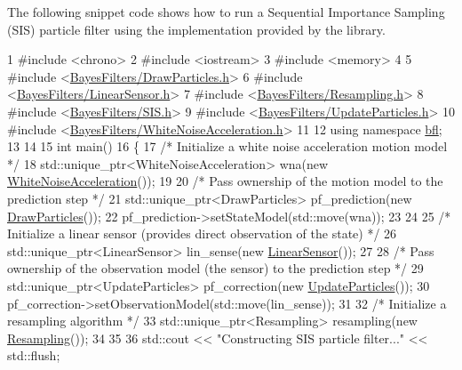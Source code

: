 The following snippet code shows how to run a Sequential Importance Sampling (S\+IS) particle filter using the implementation provided by the library.~\newline



\begin{DoxyCodeInclude}
1 \textcolor{preprocessor}{#include <chrono>}
2 \textcolor{preprocessor}{#include <iostream>}
3 \textcolor{preprocessor}{#include <memory>}
4 
5 \textcolor{preprocessor}{#include <\mbox{\hyperlink{DrawParticles_8h}{BayesFilters/DrawParticles.h}}>}
6 \textcolor{preprocessor}{#include <\mbox{\hyperlink{LinearSensor_8h}{BayesFilters/LinearSensor.h}}>}
7 \textcolor{preprocessor}{#include <\mbox{\hyperlink{Resampling_8h}{BayesFilters/Resampling.h}}>}
8 \textcolor{preprocessor}{#include <\mbox{\hyperlink{SIS_8h}{BayesFilters/SIS.h}}>}
9 \textcolor{preprocessor}{#include <\mbox{\hyperlink{UpdateParticles_8h}{BayesFilters/UpdateParticles.h}}>}
10 \textcolor{preprocessor}{#include <\mbox{\hyperlink{WhiteNoiseAcceleration_8h}{BayesFilters/WhiteNoiseAcceleration.h}}>}
11 
12 \textcolor{keyword}{using namespace }\mbox{\hyperlink{namespacebfl}{bfl}};
13 
14 
15 \textcolor{keywordtype}{int} main()
16 \{
17     \textcolor{comment}{/* Initialize a white noise acceleration motion model */}
18     std::unique\_ptr<WhiteNoiseAcceleration> wna(\textcolor{keyword}{new} \mbox{\hyperlink{classbfl_1_1WhiteNoiseAcceleration}{WhiteNoiseAcceleration}}());
19 
20     \textcolor{comment}{/* Pass ownership of the motion model to the prediction step */}
21     std::unique\_ptr<DrawParticles> pf\_prediction(\textcolor{keyword}{new} \mbox{\hyperlink{classbfl_1_1DrawParticles}{DrawParticles}}());
22     pf\_prediction->setStateModel(std::move(wna));
23 
24 
25     \textcolor{comment}{/* Initialize a linear sensor (provides direct observation of the state) */}
26     std::unique\_ptr<LinearSensor> lin\_sense(\textcolor{keyword}{new} \mbox{\hyperlink{classbfl_1_1LinearSensor}{LinearSensor}}());
27 
28     \textcolor{comment}{/* Pass ownership of the observation model (the sensor) to the prediction step */}
29     std::unique\_ptr<UpdateParticles> pf\_correction(\textcolor{keyword}{new} \mbox{\hyperlink{classbfl_1_1UpdateParticles}{UpdateParticles}}());
30     pf\_correction->setObservationModel(std::move(lin\_sense));
31 
32     \textcolor{comment}{/* Initialize a resampling algorithm */}
33     std::unique\_ptr<Resampling> resampling(\textcolor{keyword}{new} \mbox{\hyperlink{classbfl_1_1Resampling}{Resampling}}());
34 
35 
36     std::cout << \textcolor{stringliteral}{"Constructing SIS particle filter..."} << std::flush;

\end{DoxyCodeInclude}
